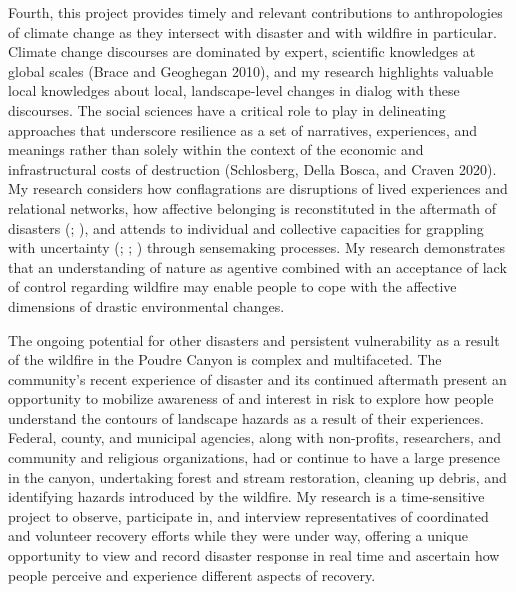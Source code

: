 \documentclass[
]{article}
\begin{document}
Fourth, this project provides timely and relevant contributions to anthropologies of climate change as they intersect with disaster and with wildfire in particular. Climate change discourses are dominated by expert, scientific knowledges at global scales (Brace and Geoghegan 2010), and my research highlights valuable local knowledges about local, landscape-level changes in dialog with these discourses. The social sciences have a critical role to play in delineating approaches that underscore resilience as a set of narratives, experiences, and meanings rather than solely within the context of the economic and infrastructural costs of destruction (Schlosberg, Della Bosca, and Craven 2020). My research considers how conflagrations are disruptions of lived experiences and relational networks, how affective belonging is reconstituted in the aftermath of disasters (; ), and attends to individual and collective capacities for grappling with uncertainty (; ; ) through sensemaking processes. My research demonstrates that an understanding of nature as agentive combined with an acceptance of lack of control regarding wildfire may enable people to cope with the affective dimensions of drastic environmental changes.

The ongoing potential for other disasters and persistent vulnerability as a result of the wildfire in the Poudre Canyon is complex and multifaceted. The community's recent experience of disaster and its continued aftermath present an opportunity to mobilize awareness of and interest in risk to explore how people understand the contours of landscape hazards as a result of their experiences. Federal, county, and municipal agencies, along with non-profits, researchers, and community and religious organizations, had or continue to have a large presence in the canyon, undertaking forest and stream restoration, cleaning up debris, and identifying hazards introduced by the wildfire. My research is a time-sensitive project to observe, participate in, and interview representatives of coordinated and volunteer recovery efforts while they were under way, offering a unique opportunity to view and record disaster response in real time and ascertain how people perceive and experience different aspects of recovery.
\end{document}
